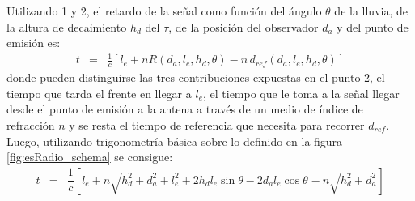 	Utilizando 1 y 2, el retardo de la señal como función del ángulo $\theta$ de la lluvia, de la altura de decaimiento $h_d$ del $\tau$, de la posición del observador $d_a$ y del punto de emisión es:
	\begin{equation}
	\begin{array}{rcl}
	t & = & \frac{1}{c}\left[l_e+nR(d_a,l_e,h_d,\theta)-n\,d_{ref}(d_a,l_e,h_d,\theta)\right]
	\end{array}
	\label{eq:toytimedelay1}
	\end{equation}
	donde pueden distinguirse las tres contribuciones expuestas en el punto 2, el tiempo que tarda el frente en llegar a $l_e$, el tiempo que le toma a la señal llegar desde el punto de emisión a la antena a través de un medio de índice de refracción $n$ y se resta el tiempo de referencia que necesita para recorrer $d_{ref}$.
	Luego, utilizando trigonometría básica sobre lo definido en la figura \ref{fig:esRadio_schema} se consigue:
	\begin{equation}
	\begin{array}{rcl}
	t & =  & 
	 \dfrac{1}{c}\left[l_e +
		n \sqrt{h_d^2+d_a^2+l_e^2+2h_dl_e \sin\theta - 2d_al_e\cos\theta} 
		-
		n \sqrt{h_d^2+d_a^2}
		\right]
	\end{array}
	\label{eq:toytimedelay2}
	\end{equation}
	
